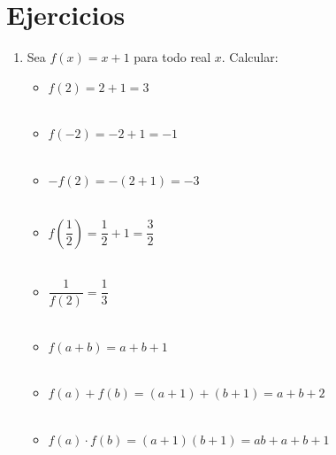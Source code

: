 \section{Ejercicios}
    \begin{enumerate}
        \item Sea $f(x)=x+1$ para todo real $x$. Calcular:
            \begin{itemize}
                \item $f(2) = 2+1 = 3$\\\\
                \item $f(-2) = -2 +1 = -1$\\\\
                \item $-f(2) = -(2+1)=-3$\\\\
                \item $f \left( \dfrac{1}{2} \right) = \dfrac{1}{2} + 1 = \dfrac{3}{2}$\\\\
                \item $\dfrac{1}{f(2)}= \dfrac{1}{3}$\\\\
                \item $f(a+b) = a+b+1$\\\\
                \item $f(a)+f(b)= (a+1) + (b+1) = a+b+2$\\\\
                \item $f(a) \cdot f(b) = (a+1)(b+1) = ab + a + b + 1$\\\\
            \end{itemize}


\end{enumerate}
